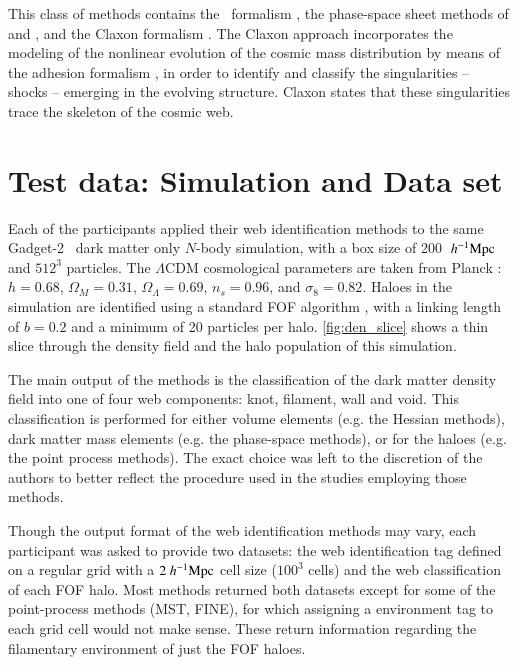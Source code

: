 \begin{itemize}
This class of methods contains the \origami\ formalism \citep{Falck2012,Falck2015}, the phase-space sheet methods of \cite{Shandarin2011} 
\citep[also see][]{Ramachandra2015} and \cite{Abel2012}, and the Claxon formalism \citep{Hidding2017}. The Claxon approach incorporates the modeling of 
the nonlinear evolution of the cosmic mass distribution by means of the adhesion 
formalism \citep{Gurbatov1989,Hidding2012}, in order to identify and classify the singularities -- shocks -- emerging 
in the evolving structure. Claxon states that these singularities trace the skeleton of the cosmic web. 
\end{itemize}
\section{Test data:  Simulation and Data set}
% 
\label{section:simulation}

Each of the participants applied their web identification methods to the same Gadget-2~\citep{Springel2005c} dark matter only $N$-body simulation, with a box size of 200 $~h^{-1}\rm Mpc$ and $512^3$ particles. The $\Lambda$CDM cosmological parameters are taken from Planck \citep{2014A&A...571A..16P}: $h=0.68$, $\Omega_M = 0.31$, $\Omega_\Lambda = 0.69$, $n_s = 0.96$, and $\sigma_8 = 0.82$. Haloes in the simulation are identified using a standard FOF algorithm \citep{Davis1985}, with a linking length of $b=0.2$ and a minimum of 20 particles per halo. \autoref{fig:den_slice} shows a thin slice through the density field and the halo population of this simulation.

The main output of the methods is the classification of the dark matter density field into one of four web components: knot, filament, wall and void. This classification is performed for either volume elements (e.g. the Hessian methods), dark matter mass elements (e.g. the phase-space methods), or for the haloes (e.g. the point process methods). The exact choice was left to the discretion of the authors to better reflect the procedure used in the studies employing those methods. 

Though the output format of the web identification methods may vary, each participant was asked to provide two datasets: the web identification tag defined on a regular grid with a $2~h^{-1}\rm Mpc$ cell size ($100^3$ cells) and the web classification of each FOF halo. Most methods returned both datasets except for some of the point-process methods (MST, FINE), for which assigning a environment tag to each grid cell would not make sense. These return information regarding the filamentary environment of just the FOF haloes.

